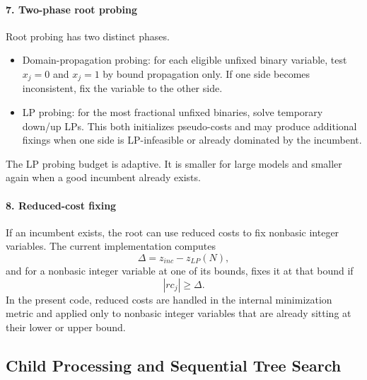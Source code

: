 \paragraph{7. Two-phase root probing}
Root probing has two distinct phases.
\begin{itemize}
  \item Domain-propagation probing: for each eligible unfixed binary variable, test \(x_j=0\) and \(x_j=1\) by bound propagation only. If one side becomes inconsistent, fix the variable to the other side.
  \item LP probing: for the most fractional unfixed binaries, solve temporary down/up LPs. This both initializes pseudo-costs and may produce additional fixings when one side is LP-infeasible or already dominated by the incumbent.
\end{itemize}

The LP probing budget is adaptive. It is smaller for large models and smaller again when a good incumbent already exists.

\paragraph{8. Reduced-cost fixing}
If an incumbent exists, the root can use reduced costs to fix nonbasic integer variables. The current implementation computes
\begin{equation}
  \Delta = z_{inc} - z_{LP}(N),
\end{equation}
and for a nonbasic integer variable at one of its bounds, fixes it at that bound if
\begin{equation}
  |rc_j| \ge \Delta.
\end{equation}
In the present code, reduced costs are handled in the internal minimization metric and applied only to nonbasic integer variables that are already sitting at their lower or upper bound.

\subsection{Child Processing and Sequential Tree Search}


